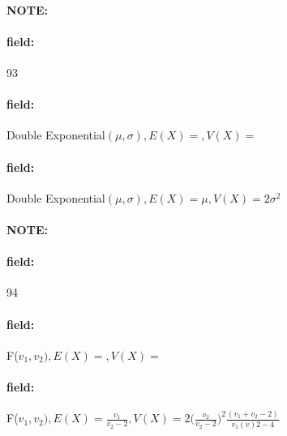 \documentclass[12pt]{article}
\newenvironment{note}{\paragraph{NOTE:}}{}
\newenvironment{field}{\paragraph{field:}}{}
\begin{document}
\begin{note} \begin{field} \tiny 93 \end{field}
  \begin{field}
    Double Exponential$(\mu,\sigma), E(X) = , V(X) = $
  \end{field}
  \begin{field}
    Double Exponential$(\mu,\sigma), E(X) = \mu, V(X) = 2\sigma^2$
  \end{field}
\end{note}

\begin{note} \begin{field} \tiny 94 \end{field}
  \begin{field}
    F($v_1,v_2), E(X) = , V(X) = $
  \end{field}
  \begin{field}
F($v_1,v_2), E(X) = \frac{v_1}{v_2-2}, V(X) = 2\big(\frac{v_2}{v_2-2}\big)^2\frac{(v_1+v_2-2)}{v_1(v)2-4}$
  \end{field}
\end{note}
\end{document}
